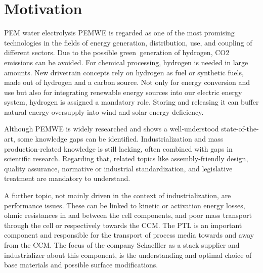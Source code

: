 
\chapter{Motivation}
\label{sec:einleitung}
\acs{PEM} water electrolysis \acs{PEMWE} is regarded as one of the most promising technologies in the fields of energy generation, distribution, use, and coupling of different sectors. Due to the possible \glqq green\grqq~generation of hydrogen, CO2 emissions can be avoided. For chemical processing, hydrogen is needed in large amounts. New drivetrain concepts rely on hydrogen as fuel or synthetic fuels, made out of hydrogen and a carbon source. Not only for energy conversion and use but also for integrating renewable energy sources into our electric energy system, hydrogen is assigned a mandatory role. Storing and releasing it can buffer natural energy oversupply into wind and solar energy deficiency.

Although \acs{PEMWE} is widely researched and shows a well-understood state-of-the-art, some knowledge gaps can be identified. Industrialization and mass production-related knowledge is still lacking, often combined with gaps in scientific research. Regarding that, related topics like assembly-friendly design, quality assurance, normative or industrial standardization, and legislative treatment are mandatory to understand. 

A further topic, not mainly driven in the context of industrialization, are performance issues. These can be linked to kinetic or activation energy losses, ohmic resistances in and between the cell components, and poor mass transport through the cell or respectively towards the \acs{CCM}. The \ac{PTL} is an important component and responsible for the transport of process media towards and away from the \acs{CCM}. The focus of the company Schaeffler as a stack supplier and industrializer about this component, is the understanding and optimal choice of base materials and possible surface modifications.

